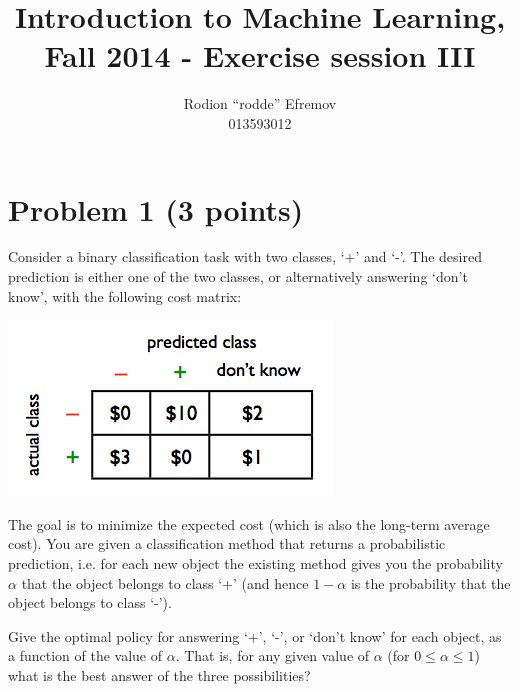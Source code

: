 \documentclass[10pt]{article}
\title{Introduction to Machine Learning, Fall 2014 - Exercise session III}
\author{Rodion ``rodde'' Efremov \\ 013593012}
\begin{document}
 \maketitle

\color{blue}
\section*{Problem 1 (3 points)}
Consider a binary classification task with two classes, `+' and `-'. The desired prediction is either one of the two classes, or alternatively answering `don't know', with the following cost matrix:
\begin{center}
\includegraphics{cost_table}
\end{center}
The goal is to minimize the expected cost (which is also the long-term average cost). You are given a classification method that returns a probabilistic prediction, i.e. for each new object the existing method gives you the probability $\alpha$ that the object belongs to class `+' (and hence $1 - \alpha$ is the probability that the object belongs to class `-').
 
\noindent Give the optimal policy for answering `+', `-', or `don't know' for each object, as a function of the value of $\alpha$. That is, for any given value of $\alpha$ (for $0 \leq \alpha \leq 1$) what is the best answer of the three possibilities?
\end{document}
